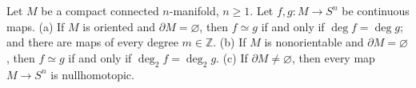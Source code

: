 Let $M$ be a compact connected $n$-manifold, $n \geqslant 1$. Let $f, g: M \to S^n$ be continuous maps.
(a) If $M$ is oriented and $\partial M = \varnothing$, then $f \simeq g$ if and only if $\deg f = \deg g$; and there are maps of every degree $m \in \mathbb{Z}$.
(b) If $M$ is nonorientable and $\partial M = \varnothing$, then $f \simeq g$ if and only if $\deg_2 f = \deg_2 g$.
(c) If $\partial M \neq \varnothing$, then every map $M \to S^n$ is nullhomotopic.
